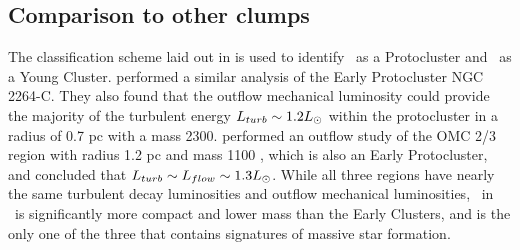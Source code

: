 \subsection{Comparison to other clumps}
The classification scheme laid out in \citet{klein2005} is used to identify
\necluster\ as a Protocluster and \swcluster\ as a Young Cluster.  \citet{maury2009}
performed a similar analysis of the Early Protocluster NGC 2264-C.  They also
found that the outflow mechanical luminosity could provide the majority of the
turbulent energy $L_{turb}\sim1.2 L_{\odot}$ within the protocluster in a radius of
0.7 pc with a mass 2300\msun .  \citet{williams2003} performed an outflow
study of the OMC 2/3 region with radius 1.2 pc and mass 1100 \msun, which is also an Early
Protocluster, and concluded that $L_{turb} \sim L_{flow} \sim 1.3 L_{\odot}$.
While all three regions have nearly the same turbulent decay luminosities and
outflow mechanical luminosities, \necluster\ in \region\ is significantly more
compact and lower mass than the Early Clusters, and is the only one of the three
that contains signatures of massive star formation.  






